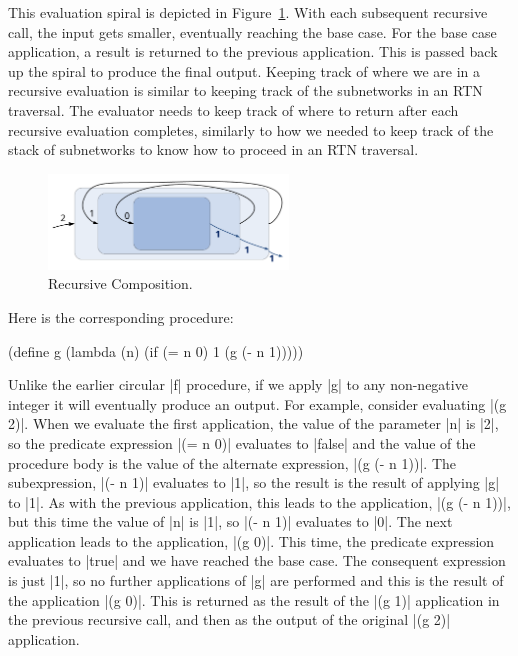 \begin{schemeregion}
This evaluation spiral is depicted in Figure~\ref{fig:recursion}.  With each subsequent recursive call, the input gets smaller, eventually reaching the base case.  For the base case application, a result is returned to the previous application.  This is passed back up the spiral to produce the final output.  Keeping track of where we are in a recursive evaluation is similar to keeping track of the subnetworks in an RTN traversal.  The evaluator needs to keep track of where to return after each recursive evaluation completes, similarly to how we needed to keep track of the stack of subnetworks to know how to proceed in an RTN traversal.

\begin{figure}[!hbt]
\begin{center}
\includegraphics[height=1.0in]{figures/recursion.pdf}
\caption{Recursive Composition.\label{fig:recursion}}
\end{center}
\end{figure}

Here is the corresponding procedure:
\begin{schemedisplay}
(define g 
  (lambda (n)  
    (if (= n 0) 1 (g (- n 1)))))
\end{schemedisplay}

Unlike the earlier circular \scheme|f| procedure, if we apply \scheme|g| to any non-negative integer it will eventually produce an output.  For example, consider evaluating \scheme|(g 2)|.  When we evaluate the first application, the value of the parameter \scheme|n| is \schemeresult|2|, so the predicate expression \scheme|(= n 0)| evaluates to \schemeresult|false| and the value of the procedure body is the value of the alternate expression, \scheme|(g (- n 1))|.  The subexpression, \scheme|(- n 1)| evaluates to \schemeresult|1|, so the result is the result of applying \scheme|g| to \schemeresult|1|.  As with the previous application, this leads to the application, \scheme|(g (- n 1))|, but this time the value of \scheme|n| is \schemeresult|1|, so \scheme|(- n 1)| evaluates to \schemeresult|0|.  The next application leads to the application, \scheme|(g 0)|.  This time, the predicate expression evaluates to \schemeresult|true| and we have reached the base case.  The consequent expression is just \scheme|1|, so no further applications of \scheme|g| are performed and this is the result of the application \scheme|(g 0)|.  This is returned as the result of the \scheme|(g 1)| application in the previous recursive call, and then as the output of the original \scheme|(g 2)| application.


\end{schemeregion}
